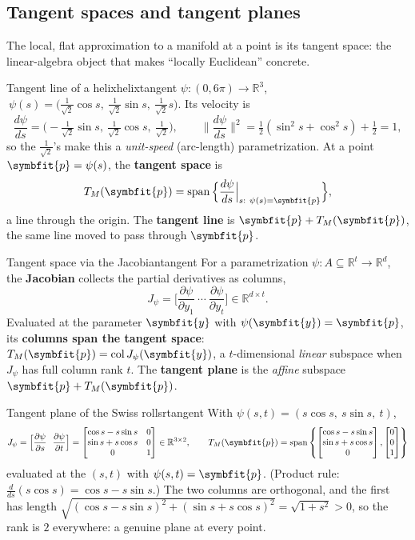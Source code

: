 \documentclass[11pt]{article}
\newcommand{\bm}[1]{\symbfit{#1}}
\newcommand{\R}{\mathbb{R}}
\newcommand{\spn}{\operatorname{span}}
\newcommand{\col}{\operatorname{col}}
\begin{document}
\subsection{Tangent spaces and tangent planes}

The local, flat approximation to a manifold at a point is its tangent space: the linear-algebra object that makes
``locally Euclidean'' concrete.

\begin{example}{Tangent line of a helix}{helixtangent}
$\psi:(0,6\pi)\to\R^3$, $\ \psi(s)=\big(\tfrac1{\sqrt2}\cos s,\ \tfrac1{\sqrt2}\sin s,\ \tfrac1{\sqrt2}s\big)$. Its velocity is
\[
\frac{d\psi}{ds}=\Big(-\tfrac1{\sqrt2}\sin s,\ \tfrac1{\sqrt2}\cos s,\ \tfrac1{\sqrt2}\Big),\qquad \Big\|\frac{d\psi}{ds}\Big\|^2=\tfrac12(\sin^2s+\cos^2s)+\tfrac12=1 ,
\]
so the $\tfrac1{\sqrt2}$'s make this a \emph{unit-speed} (arc-length) parametrization. At a point $\bm p=\psi(s)$, the \textbf{tangent space} is
\[
T_M(\bm p)=\spn\Big\{\frac{d\psi}{ds}\Big|_{s:\ \psi(s)=\bm p}\Big\},
\]
a line through the origin. The \textbf{tangent line} is $\bm p+T_M(\bm p)$, the same line moved to pass through $\bm p$.
\end{example}

\begin{definition}{Tangent space via the Jacobian}{tangent}
For a parametrization $\psi:A\subseteq\R^t\to\R^d$, the \textbf{Jacobian} collects the partial derivatives as columns,
\[
J_\psi=\Big[\frac{\partial\psi}{\partial y_1}\ \cdots\ \frac{\partial\psi}{\partial y_t}\Big]\in\R^{d\times t}.
\]
Evaluated at the parameter $\bm y$ with $\psi(\bm y)=\bm p$, its \textbf{columns span the tangent space}: $T_M(\bm p)=\col J_\psi(\bm y)$, a $t$-dimensional
\emph{linear} subspace when $J_\psi$ has full column rank $t$. The \textbf{tangent plane} is the \emph{affine} subspace $\bm p+T_M(\bm p)$.
\end{definition}

\begin{example}{Tangent plane of the Swiss roll}{srtangent}
With $\psi(s,t)=(s\cos s,\ s\sin s,\ t)$,
\[
J_\psi=\Big[\frac{\partial\psi}{\partial s}\ \ \frac{\partial\psi}{\partial t}\Big]=\begin{bmatrix}\cos s-s\sin s&0\\ \sin s+s\cos s&0\\ 0&1\end{bmatrix}\in\R^{3\times2},
\qquad
T_M(\bm p)=\spn\left\{\begin{bmatrix}\cos s-s\sin s\\\sin s+s\cos s\\0\end{bmatrix},\begin{bmatrix}0\\0\\1\end{bmatrix}\right\}
\]
evaluated at the $(s,t)$ with $\psi(s,t)=\bm p$. (Product rule: $\tfrac{d}{ds}(s\cos s)=\cos s-s\sin s$.) The two columns are orthogonal, and the first
has length $\sqrt{(\cos s-s\sin s)^2+(\sin s+s\cos s)^2}=\sqrt{1+s^2}>0$, so the rank is $2$ everywhere: a genuine plane at every point.
\end{example}
\end{document}
